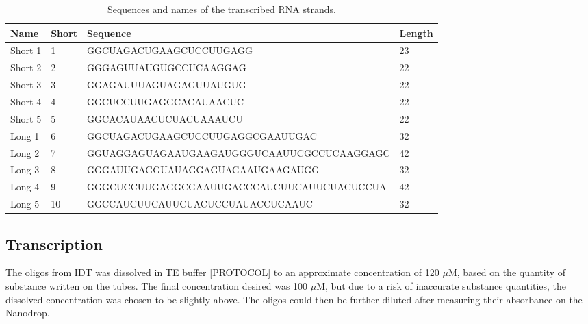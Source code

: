 \begin{table}
\begin{adjustbox}{width=\columnwidth}
\small
\begin{tabular}{llll}
\hline
\textbf{Name}      & \textbf{Short} & \textbf{Sequence}                                           & \textbf{Length} \\
\hline
Short 1            & 1          & GGCUAGACUGAAGCUCCUUGAGG                    & 23     \\
Short 2            & 2          & GGGAGUUAUGUGCCUCAAGGAG                     & 22     \\
Short 3            & 3          & GGAGAUUUAGUAGAGUUAUGUG                     & 22     \\
Short 4            & 4          & GGCUCCUUGAGGCACAUAACUC                     & 22     \\
Short 5            & 5          & GGCACAUAACUCUACUAAAUCU                     & 22     \\
Long 1             & 6          & GGCUAGACUGAAGCUCCUUGAGGCGAAUUGAC           & 32     \\
Long 2             & 7          & GGUAGGAGUAGAAUGAAGAUGGGUCAAUUCGCCUCAAGGAGC & 42     \\
Long 3             & 8          & GGGAUUGAGGUAUAGGAGUAGAAUGAAGAUGG           & 32     \\
Long 4             & 9          & GGGCUCCUUGAGGCGAAUUGACCCAUCUUCAUUCUACUCCUA & 42     \\
Long 5             & 10         & GGCCAUCUUCAUUCUACUCCUAUACCUCAAUC           & 32     \\
\hline
\end{tabular}
\end{adjustbox}
\caption{Sequences and names of the transcribed RNA strands.}
\end{table}

\subsection{Transcription}

The oligos from IDT was dissolved in TE buffer [PROTOCOL] to an approximate concentration of 120 $\mu$M, based on the quantity of substance written on the tubes. The final concentration desired was 100 $\mu$M, but due to a risk of inaccurate substance quantities, the dissolved concentration was chosen to be slightly above. The oligos could then be further diluted after measuring their absorbance on the Nanodrop.

